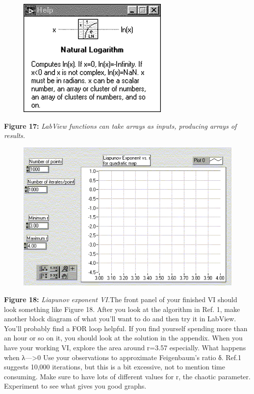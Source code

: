 \documentclass{../lab}
\begin{document}
\begin{figure}[h]
    \centering
    \href{http://experimentationlab.berkeley.edu/sites/default/files/images/Nldimage106.gif}{\includegraphics[width=0.5\linewidth]{images/Nldimage106.png}}
    \caption{}
    \label{fig:Nldimage106}
\end{figure}

\textbf{Figure 17:} \emph{LabView functions can take arrays as inputs, producing arrays of results.}
\begin{figure}[h]
    \centering
    \href{http://experimentationlab.berkeley.edu/sites/default/files/images/Nldimage107.gif}{\includegraphics[width=0.5\linewidth]{images/Nldimage107.png}}
    \caption{}
    \label{fig:Nldimage107}
\end{figure}

\textbf{Figure 18:} \emph{Liapunov exponent VI.}The front panel of your finished VI should look something like Figure 18. After you look at the algorithm in Ref. 1, make another block diagram of what you'll want to do and then try it in LabView. You'll probably find a FOR loop helpful. If you find yourself spending more than an hour or so on it, you should look at the solution in the appendix. When you have your working VI, explore the area around r=3.57 especially. What happens when λ--->0 Use your observations to approximate Feigenbaum's ratio δ. Ref.1 suggests 10,000 iterations, but this is a bit excessive, not to mention time consuming. Make sure to have lots of different values for r, the chaotic parameter. Experiment to see what gives you good graphs.
\end{document}
